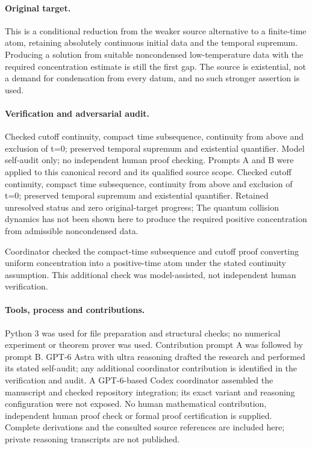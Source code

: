 \documentclass[11pt]{article}
\begin{document}
\paragraph{Original target.} This is a conditional reduction from the weaker source alternative to a finite-time atom, retaining absolutely continuous initial data and the temporal supremum. Producing a solution from suitable noncondensed low-temperature data with the required concentration estimate is still the first gap. The source is existential, not a demand for condensation from every datum, and no such stronger assertion is used.

\paragraph{Verification and adversarial audit.}
Checked cutoff continuity, compact time subsequence, continuity from above and exclusion of t=0; preserved temporal supremum and existential quantifier. Model self-audit only; no independent human proof checking. Prompts A and B were applied to this canonical record and its qualified source scope. Checked cutoff continuity, compact time subsequence, continuity from above and exclusion of t=0; preserved temporal supremum and existential quantifier. Retained unresolved status and zero original-target progress; The quantum collision dynamics has not been shown here to produce the required positive concentration from admissible noncondensed data.

Coordinator checked the compact-time subsequence and cutoff proof converting uniform concentration into a positive-time atom under the stated continuity assumption. This additional check was model-assisted, not independent human verification.

\paragraph{Tools, process and contributions.}
Python 3 was used for file preparation and structural checks; no numerical experiment or theorem prover was used. Contribution prompt A was followed by prompt B. GPT-6 Astra with ultra reasoning drafted the research and performed its stated self-audit; any additional coordinator contribution is identified in the verification and audit. A GPT-6-based Codex coordinator assembled the manuscript and checked repository integration; its exact variant and reasoning configuration were not exposed. No human mathematical contribution, independent human proof check or formal proof certification is supplied. Complete derivations and the consulted source references are included here; private reasoning transcripts are not published.
\end{document}
